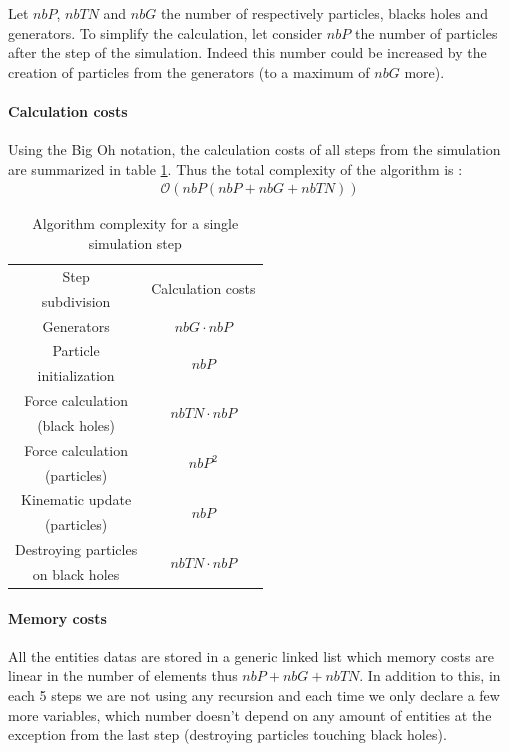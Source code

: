 \documentclass[a4paper]{article} %
\begin{document}
\begin{multicols*}{2}
Let $nbP$, $nbTN$ and $nbG$ the number of respectively particles, blacks holes and generators.
To simplify the calculation, let consider $nbP$ the number of particles after the step of the simulation.
Indeed this number could be increased by the creation of particles from the generators (to a maximum of $nbG$ more).



\paragraph{Calculation costs}
Using the Big Oh notation, the calculation costs of all steps from the simulation
are summarized in table \ref{tab-calc}. Thus the total complexity of the algorithm is :
\begin{align}
\mathcal{O}(nbP (nbP + nbG + nbTN))
\end{align}


\begin{table}[H]
\begin{center}
\begin{tabular}{|c|c|}
\hline
Step & \multicolumn{1}{|c|}{\multirow{2}{*}{Calculation costs}} \\
subdivision   &  \\
\hline
\hline
Generators &  $nbG\cdot nbP$\\
\hline
Particle  &       \multicolumn{1}{|c|}{\multirow{2}{*}{$nbP$}}\\
initialization &  \\
\hline
Force calculation  & \multicolumn{1}{|c|}{\multirow{2}{*}{$nbTN\cdot nbP$}}\\
(black holes) &  \\
\hline
Force calculation  & \multicolumn{1}{|c|}{\multirow{2}{*}{$nbP^2$}}\\
(particles) &  \\
\hline
Kinematic update  & \multicolumn{1}{|c|}{\multirow{2}{*}{$nbP$}}\\
(particles) &  \\
\hline
Destroying particles &  \multicolumn{1}{|c|}{\multirow{2}{*}{$nbTN\cdot nbP$}}\\
 on black holes &  \\
\hline
\end{tabular}
\end{center}
\caption{Algorithm complexity for a single simulation step}
\label{tab-calc}
\end{table}

\paragraph{Memory costs} All the entities datas are stored in a generic linked list
which memory costs are linear in the number of elements thus $nbP + nbG + nbTN$.
In addition to this, in each 5 steps we are not using any recursion and each time we only
declare a few more variables, which number doesn't depend on any amount of entities
at the exception from the last step (destroying particles touching black holes).


\end{multicols*}
\end{document}
